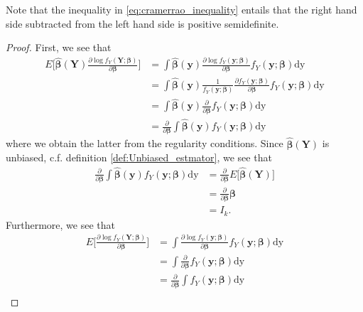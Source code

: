 Note that the inequality in \eqref{eq:cramerrao_inequality} entails that the right hand side subtracted from the left hand side is positive semidefinite.

\begin{proof}
First, we see that
\begin{align*}
    E\Big[\boldsymbol{\hat{\beta}}(\textbf{Y}) \frac{\partial \log f_Y(\textbf{Y};\boldsymbol{\beta})}{\partial \boldsymbol{\beta}} \Big]
    &=\int \boldsymbol{\hat{\beta}}(\textbf{y})\frac{\partial \log f_Y(\textbf{y};\boldsymbol{\beta})}{\partial \boldsymbol{\beta}}f_Y(\textbf{y};\boldsymbol{\beta}) \text{dy} \\
    &= \int \boldsymbol{\hat{\beta}}(\textbf{y})\frac{1}{f_Y(\textbf{y};\boldsymbol{\beta})}\frac{\partial f_Y(\textbf{y};\boldsymbol{\beta})}{\partial \boldsymbol{\beta}}f_Y(\textbf{y};\boldsymbol{\beta}) \text{dy} \\
    &=\int \boldsymbol{\hat{\beta}}(\textbf{y}) \frac{\partial}{\partial \boldsymbol{\beta}}f_Y(\textbf{y};\boldsymbol{\beta}) \text{dy} \\
    &=\frac{\partial}{\partial \boldsymbol{\beta}} \int \boldsymbol{\hat{\beta}}(\textbf{y}) f_Y(\textbf{y};\boldsymbol{\beta}) \text{dy}
\end{align*}
where we obtain the latter from the regularity conditions. 
Since $\boldsymbol{\hat{\beta}}(\textbf{Y})$ is unbiased, c.f. definition \ref{def:Unbiased_estmator}, we see that
\begin{align}
    \frac{\partial}{\partial \boldsymbol{\beta}} \int \boldsymbol{\hat{\beta}}(\textbf{y}) f_Y(\textbf{y};\boldsymbol{\beta}) \text{dy} &= \frac{\partial}{\partial\boldsymbol{\beta}} E\big[ \boldsymbol{\hat{\beta}}(\textbf{Y})\big] \nonumber\\
    &= \frac{\partial}{\partial\boldsymbol{\beta}} \boldsymbol{\beta} \nonumber\\
    &= I_{k} \label{eq:cramerraoe2stjerner}.
\end{align}
Furthermore, we see that
\begin{align}
    E\Big[ \frac{\partial \log f_Y(\textbf{Y};\boldsymbol{\beta})}{\partial \boldsymbol{\beta}}\Big] &= \int \frac{\partial \log f_Y(\textbf{y};\boldsymbol{\beta})}{\partial \boldsymbol{\beta}}f_Y(\textbf{y};\boldsymbol{\beta}) \text{dy} \nonumber \\
    &=\int  \frac{\partial}{\partial \boldsymbol{\beta}}f_Y(\textbf{y};\boldsymbol{\beta}) \text{dy} \nonumber \\
    &=\frac{\partial}{\partial \boldsymbol{\beta}} \int f_Y(\textbf{y};\boldsymbol{\beta}) \text{dy} \nonumber \\

\end{align}
\end{proof}

